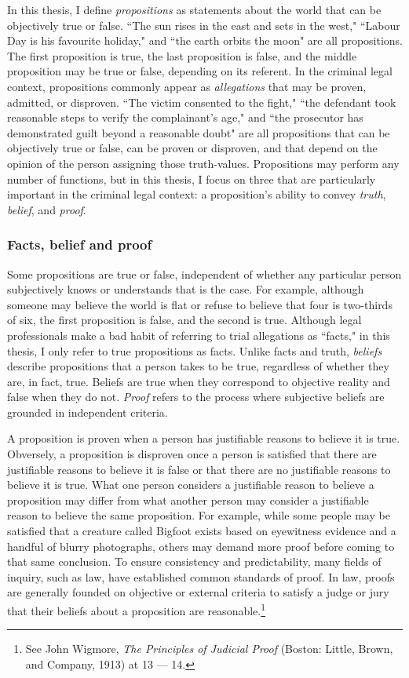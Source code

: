 In this thesis, I define \textit{propositions} as statements about the world that can be objectively true or false. ``The sun rises in the east and sets in the west," ``Labour Day is his favourite holiday," and ``the earth orbits the moon" are all propositions. The first proposition is true, the last proposition is false, and the middle proposition may be true or false, depending on its referent. In the criminal legal context, propositions commonly appear as \textit{allegations} that may be proven, admitted, or disproven. ``The victim consented to the fight," ``the defendant took reasonable steps to verify the complainant's age," and ``the prosecutor has demonstrated guilt beyond a reasonable doubt" are all propositions that can be objectively true or false, can be proven or disproven, and that depend on the opinion of the person assigning those truth-values. Propositions may perform any number of functions, but in this thesis, I focus on three that are particularly important in the criminal legal context: a proposition's ability to convey \textit{truth}, \textit{belief}, and \textit{proof}.

\subsubsection{Facts, belief and proof}

Some propositions are true or false, independent of whether any particular person subjectively knows or understands that is the case. For example, although someone may believe the world is flat or refuse to believe that four is two-thirds of six, the first proposition is false, and the second is true. Although legal professionals make a bad habit of referring to trial allegations as ``facts," in this thesis, I only refer to true propositions as facts. Unlike facts and truth, \textit{beliefs} describe propositions that a person takes to be true, regardless of whether they are, in fact, true. Beliefs are true when they correspond to objective reality and false when they do not. \textit{Proof} refers to the process where subjective beliefs are grounded in independent criteria. 

A proposition is proven when a person has justifiable reasons to believe it is true. Obversely, a proposition is disproven once a person is satisfied that there are justifiable reasons to believe it is false or that there are no justifiable reasons to believe it is true. What one person considers a justifiable reason to believe a proposition may differ from what another person may consider a justifiable reason to believe the same proposition. For example, while some people may be satisfied that a creature called Bigfoot exists based on eyewitness evidence and a handful of blurry photographs, others may demand more proof before coming to that same conclusion. To ensure consistency and predictability, many fields of inquiry, such as law, have established common standards of proof. In law, proofs are generally founded on objective or external criteria to satisfy a judge or jury that their beliefs about a proposition are reasonable.\footnote{See John Wigmore, \textit{The Principles of Judicial Proof} (Boston: Little, Brown, and Company, 1913) at 13 — 14.}

